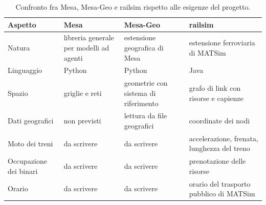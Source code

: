 \begin{table}[H]
	\centering
	\caption{Confronto fra Mesa, Mesa-Geo e railsim rispetto alle esigenze del progetto.}
	\label{tab:confronto-strumenti}
	\begin{tabularx}{\textwidth}{lXXX}
		\toprule
		Aspetto & Mesa & Mesa-Geo & railsim \\
		\midrule
		Natura & libreria generale per modelli ad agenti & estensione geografica di Mesa & estensione ferroviaria di MATSim \\
		Linguaggio & Python & Python & Java \\
		Spazio & griglie e reti & geometrie con sistema di riferimento & grafo di link con risorse e capienze \\
		Dati geografici & non previsti & lettura da file geografici & coordinate dei nodi \\
		Moto dei treni & da scrivere & da scrivere & accelerazione, frenata, lunghezza del treno \\
		Occupazione dei binari & da scrivere & da scrivere & prenotazione delle risorse \\
		Orario & da scrivere & da scrivere & orario del trasporto pubblico di MATSim \\
		\bottomrule
	\end{tabularx}
\end{table}